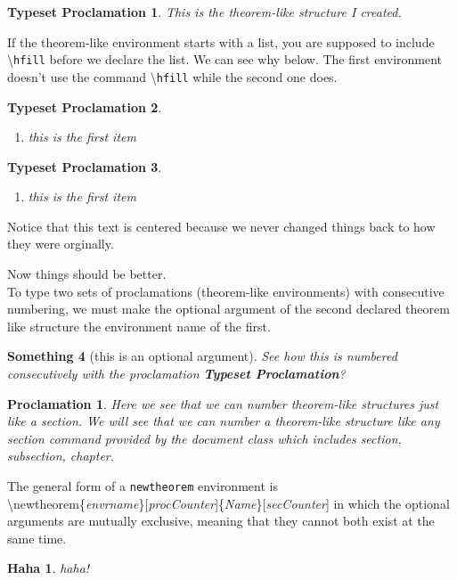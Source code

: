 \documentclass[12pt]{amsart}
\theoremstyle{plain}
\newtheorem{name of environment}{Typeset Proclamation} %
\newtheorem{something}[name of environment]{Something}
\newtheorem*{no numbering}{No Numbering}
\newtheorem{proclamation}{Proclamation}[section]
\newtheorem{haha}{Haha}[section]
\theoremstyle{definition}
\theoremstyle{remark}
\begin{document}
\begin{name of environment} %
This is the theorem-like structure I created.
\end{name of environment}
\vspace{12pt}
\newpage

If the theorem-like environment starts with a list, you are supposed to include \textbackslash \texttt{hfill} before we declare the list. We can see why below. The first environment doesn't use the command \textbackslash \texttt{hfill} while the second one does. 

\begin{name of environment}
	\begin{enumerate}
	\item this is the first item
	\end{enumerate}
\end{name of environment}

\begin{name of environment}
	\hfill
	\begin{enumerate}
	\item this is the first item
	\end{enumerate}
\end{name of environment}

Notice that this text is centered because we never changed things back to how they were orginally.
\vspace{12pt}

\raggedright Now things should be better. \\
To type two sets of proclamations (theorem-like environments) with consecutive numbering, we must make the optional argument of the second declared theorem like structure the environment name of the first. 

\begin{something}[this is an optional argument]
See how this is numbered consecutively with the proclamation \textbf{Typeset Proclamation}?
\end{something}

\begin{proclamation}
Here we see that we can number theorem-like structures just like a section. We will see that we can number a theorem-like structure like any section command provided by the document class which includes section, subsection, chapter. 
\end{proclamation}
The general form of a \texttt{newtheorem} environment is \\ \textbackslash newtheorem\{\emph{envrname}\}[\emph{procCounter}]\{\emph{Name}\}[\emph{secCounter}] in which the optional arguments are mutually exclusive, meaning that they cannot both exist at the same time.
\begin{haha}
haha!
\end{haha}
\end{document}
